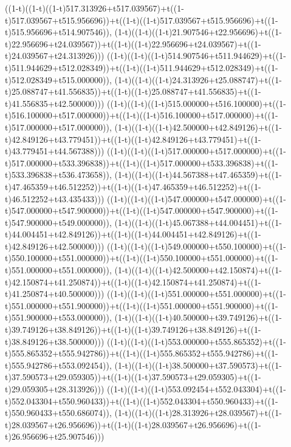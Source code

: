 ((1-t)((1-t)((1-t)517.313926+t517.039567)+t((1-t)517.039567+t515.956696))+t((1-t)((1-t)517.039567+t515.956696)+t((1-t)515.956696+t514.907546)),                                     (1-t)((1-t)((1-t)21.907546+t22.956696)+t((1-t)22.956696+t24.039567))+t((1-t)((1-t)22.956696+t24.039567)+t((1-t)24.039567+t24.313926)))
((1-t)((1-t)((1-t)514.907546+t511.944629)+t((1-t)511.944629+t512.028349))+t((1-t)((1-t)511.944629+t512.028349)+t((1-t)512.028349+t515.000000)),                                     (1-t)((1-t)((1-t)24.313926+t25.088747)+t((1-t)25.088747+t41.556835))+t((1-t)((1-t)25.088747+t41.556835)+t((1-t)41.556835+t42.500000)))
((1-t)((1-t)((1-t)515.000000+t516.100000)+t((1-t)516.100000+t517.000000))+t((1-t)((1-t)516.100000+t517.000000)+t((1-t)517.000000+t517.000000)),                                     (1-t)((1-t)((1-t)42.500000+t42.849126)+t((1-t)42.849126+t43.779451))+t((1-t)((1-t)42.849126+t43.779451)+t((1-t)43.779451+t44.567388)))
((1-t)((1-t)((1-t)517.000000+t517.000000)+t((1-t)517.000000+t533.396838))+t((1-t)((1-t)517.000000+t533.396838)+t((1-t)533.396838+t536.473658)),                                     (1-t)((1-t)((1-t)44.567388+t47.465359)+t((1-t)47.465359+t46.512252))+t((1-t)((1-t)47.465359+t46.512252)+t((1-t)46.512252+t43.435433)))
((1-t)((1-t)((1-t)547.000000+t547.000000)+t((1-t)547.000000+t547.900000))+t((1-t)((1-t)547.000000+t547.900000)+t((1-t)547.900000+t549.000000)),                                     (1-t)((1-t)((1-t)45.067388+t44.004451)+t((1-t)44.004451+t42.849126))+t((1-t)((1-t)44.004451+t42.849126)+t((1-t)42.849126+t42.500000)))
((1-t)((1-t)((1-t)549.000000+t550.100000)+t((1-t)550.100000+t551.000000))+t((1-t)((1-t)550.100000+t551.000000)+t((1-t)551.000000+t551.000000)),                                     (1-t)((1-t)((1-t)42.500000+t42.150874)+t((1-t)42.150874+t41.250874))+t((1-t)((1-t)42.150874+t41.250874)+t((1-t)41.250874+t40.500000)))
((1-t)((1-t)((1-t)551.000000+t551.000000)+t((1-t)551.000000+t551.900000))+t((1-t)((1-t)551.000000+t551.900000)+t((1-t)551.900000+t553.000000)),                                     (1-t)((1-t)((1-t)40.500000+t39.749126)+t((1-t)39.749126+t38.849126))+t((1-t)((1-t)39.749126+t38.849126)+t((1-t)38.849126+t38.500000)))
((1-t)((1-t)((1-t)553.000000+t555.865352)+t((1-t)555.865352+t555.942786))+t((1-t)((1-t)555.865352+t555.942786)+t((1-t)555.942786+t553.092454)),                                     (1-t)((1-t)((1-t)38.500000+t37.590573)+t((1-t)37.590573+t29.059305))+t((1-t)((1-t)37.590573+t29.059305)+t((1-t)29.059305+t28.313926)))
((1-t)((1-t)((1-t)553.092454+t552.043304)+t((1-t)552.043304+t550.960433))+t((1-t)((1-t)552.043304+t550.960433)+t((1-t)550.960433+t550.686074)),                                     (1-t)((1-t)((1-t)28.313926+t28.039567)+t((1-t)28.039567+t26.956696))+t((1-t)((1-t)28.039567+t26.956696)+t((1-t)26.956696+t25.907546)))
